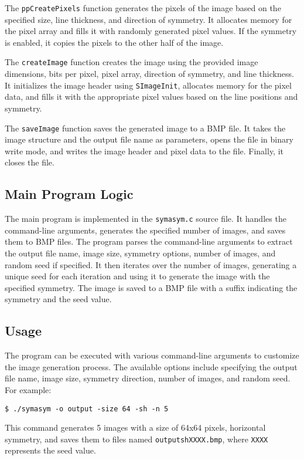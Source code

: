 \documentclass{report}
\begin{document}
The \texttt{ppCreatePixels} function generates the pixels of the image based on the specified size, line thickness, and direction of symmetry. It allocates memory for the pixel array and fills it with randomly generated pixel values. If the symmetry is enabled, it copies the pixels to the other half of the image.

The \texttt{createImage} function creates the image using the provided image dimensions, bits per pixel, pixel array, direction of symmetry, and line thickness. It initializes the image header using \texttt{SImageInit}, allocates memory for the pixel data, and fills it with the appropriate pixel values based on the line positions and symmetry.

The \texttt{saveImage} function saves the generated image to a BMP file. It takes the image structure and the output file name as parameters, opens the file in binary write mode, and writes the image header and pixel data to the file. Finally, it closes the file.

\subsection{Main Program Logic}

The main program is implemented in the \texttt{symasym.c} source file. It handles the command-line arguments, generates the specified number of images, and saves them to BMP files. The program parses the command-line arguments to extract the output file name, image size, symmetry options, number of images, and random seed if specified. It then iterates over the number of images, generating a unique seed for each iteration and using it to generate the image with the specified symmetry. The image is saved to a BMP file with a suffix indicating the symmetry and the seed value.

\subsection{Usage}

The program can be executed with various command-line arguments to customize the image generation process. The available options include specifying the output file name, image size, symmetry direction, number of images, and random seed. For example:

\texttt{\$ ./symasym -o output -size 64 -sh -n 5}

This command generates 5 images with a size of 64x64 pixels, horizontal symmetry, and saves them to files named \texttt{outputshXXXX.bmp}, where \texttt{XXXX} represents the seed value.
\end{document}
